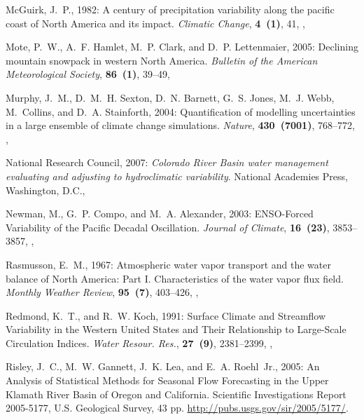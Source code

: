 \documentclass[final, double]{ua-thesis}
\begin{document}
\begin{thebibliography}{}
McGuirk, J.~P., 1982: A century of precipitation variability along the pacific
  coast of {North} {America} and its impact. \textit{Climatic Change},
  \textbf{4~(1)}, 41, ,

Mote, P.~W., A.~F. Hamlet, M.~P. Clark, and D.~P. Lettenmaier, 2005: Declining
  mountain snowpack in western {North} {America}. \textit{Bulletin of the
  American Meteorological Society}, \textbf{86~(1)}, 39--49,

Murphy, J.~M., D.~M.~H. Sexton, D.~N. Barnett, G.~S. Jones, M.~J. Webb,
  M.~Collins, and D.~A. Stainforth, 2004: Quantification of modelling
  uncertainties in a large ensemble of climate change simulations.
  \textit{Nature}, \textbf{430~(7001)}, 768--772, ,

{National Research Council}, 2007: \textit{Colorado {River} {Basin} water
  management evaluating and adjusting to hydroclimatic variability}. National
  Academies Press, Washington, D.C.,

Newman, M., G.~P. Compo, and M.~A. Alexander, 2003: {ENSO}-{Forced}
  {Variability} of the {Pacific} {Decadal} {Oscillation}. \textit{Journal of
  Climate}, \textbf{16~(23)}, 3853--3857,
  ,

Rasmusson, E.~M., 1967: Atmospheric water vapor transport and the water balance
  of {North} {America}: {Part} {I}. {Characteristics} of the water vapor flux
  field. \textit{Monthly Weather Review}, \textbf{95~(7)}, 403--426,
  ,

Redmond, K.~T., and R.~W. Koch, 1991: Surface {Climate} and {Streamflow}
  {Variability} in the {Western} {United} {States} and {Their} {Relationship}
  to {Large}-{Scale} {Circulation} {Indices}. \textit{Water Resour. Res.},
  \textbf{27~(9)}, 2381--2399, ,

Risley, J.~C., M.~W. Gannett, J.~K. Lea, and E.~A. Roehl~Jr., 2005: An
  {Analysis} of {Statistical} {Methods} for {Seasonal} {Flow} {Forecasting} in
  the {Upper} {Klamath} {River} {Basin} of {Oregon} and {California}.
  Scientific {Investigations} {Report} 2005-5177, U.S. Geological Survey, 43
  pp. \urlprefix\url{http://pubs.usgs.gov/sir/2005/5177/}.


\end{thebibliography}
\end{document}
